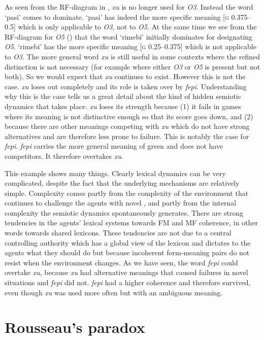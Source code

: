 As seen from the RF-diagram in , \textit{xu} is no
longer used for \emph{O3}. Instead the word `pasi' comes to 
dominate. `pasi' has indeed the more specific 
meaning [\textsc{g} 0.375–0.5] which is only applicable to \emph{O3}, 
not to \emph{O5}. At the same time we see from the RF-diagram 
for \emph{O5} ()
that the word `rimebi' initially dominates for designating \emph{O5}. 
`rimebi' has the more specific meaning [\textsc{g} 0.25–0.375] which 
is not applicable to \emph{O3}. 
The more general word \textit{xu} is still useful in some 
contexts where the
refined distinction is not necessary (for example where 
either \emph{O3} or \emph{O5} is present but not both). So we would expect
that \textit{xu} continues to exist. However this is not the case. \textit{xu}
loses out completely and its role is taken over by \textit{fepi}. 
\clearpage
Understanding why this is the case
tells us a great detail about the kind 
of hidden semiotic dynamics that takes place. \textit{xu} loses its
strength because (1) it fails in games where its meaning
is not distinctive enough so that its score goes
down, and (2) because there 
are other meanings competing with \textit{xu} which do not 
have strong alternatives and are therefore
less prone to failure. This is notably the case for
\textit{fepi}. \textit{fepi} carries the more general meaning of green
and does not have competitors. It therefore overtakes
\textit{xu}. 

This example shows many things. Clearly
lexical dynamics can be very complicated, despite the 
fact that the underlying mechanisms are relatively 
simple. Complexity comes partly from the complexity of
the environment that continues to challenge the agents
with novel , and partly from the internal 
complexity the semiotic dynamics spontaneously generates. 
There are strong tendencies in the agents' lexical systems
towards FM and MF coherence, 
in other words towards shared lexicons. These tendencies
are not due to a central controlling authority which 
has a global view of the lexicon and dictates to the 
agents what they should do but because incoherent 
form-meaning pairs do not resist when the environment 
changes. As we have seen, the word \textit{fepi} could 
overtake \textit{xu}, because \textit{xu} had alternative meanings that 
caused failures in novel situations and \textit{fepi} did not. 
\textit{fepi} had a higher coherence and therefore survived, even
though \textit{xu} was used more often but with an 
ambiguous meaning. 

\section{Rousseau's paradox}

